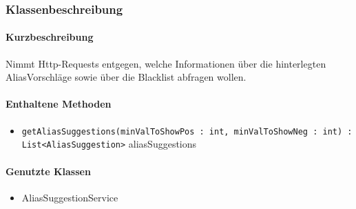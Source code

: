 \subsubsection*{Klassenbeschreibung}%
\paragraph*{Kurzbeschreibung}
Nimmt Http-Requests entgegen, welche Informationen über die hinterlegten AliasVorschläge sowie über die Blacklist abfragen wollen.
\paragraph*{Enthaltene Methoden}
\begin{itemize}
    \item \texttt{getAliasSuggestions(minValToShowPos : int, minValToShowNeg : int) : List<AliasSuggestion>} aliasSuggestions
\end{itemize}
\paragraph*{Genutzte Klassen}
\begin{itemize}
    \item AliasSuggestionService
\end{itemize}
